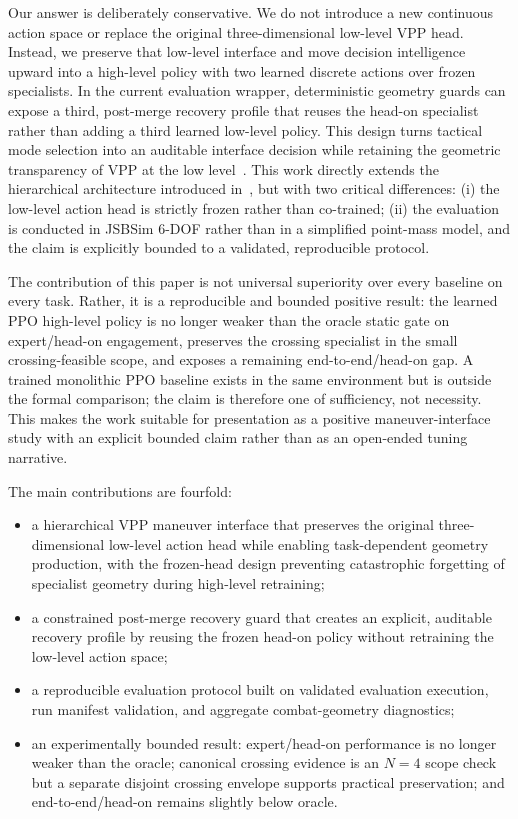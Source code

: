 \documentclass[5p,times]{elsarticle} %
\begin{document}
Our answer is deliberately conservative. We do not introduce a new continuous action space or replace the original three-dimensional low-level VPP head. Instead, we preserve that low-level interface and move decision intelligence upward into a high-level policy with two learned discrete actions over frozen specialists. In the current evaluation wrapper, deterministic geometry guards can expose a third, post-merge recovery profile that reuses the head-on specialist rather than adding a third learned low-level policy. This design turns tactical mode selection into an auditable interface decision while retaining the geometric transparency of VPP at the low level~\cite{glanois2024}. This work directly extends the hierarchical architecture introduced in~\cite{lai2026aerospace}, but with two critical differences: (i) the low-level action head is strictly frozen rather than co-trained; (ii) the evaluation is conducted in JSBSim 6-DOF rather than in a simplified point-mass model, and the claim is explicitly bounded to a validated, reproducible protocol.

The contribution of this paper is not universal superiority over every baseline on every task. Rather, it is a reproducible and bounded positive result: the learned PPO high-level policy is no longer weaker than the oracle static gate on expert/head-on engagement, preserves the crossing specialist in the small crossing-feasible scope, and exposes a remaining end-to-end/head-on gap. A trained monolithic PPO baseline exists in the same environment but is outside the formal comparison; the claim is therefore one of sufficiency, not necessity. This makes the work suitable for presentation as a positive maneuver-interface study with an explicit bounded claim rather than as an open-ended tuning narrative.

The main contributions are fourfold:
\begin{itemize}
    \item a hierarchical VPP maneuver interface that preserves the original three-dimensional low-level action head while enabling task-dependent geometry production, with the frozen-head design preventing catastrophic forgetting of specialist geometry during high-level retraining;
    \item a constrained post-merge recovery guard that creates an explicit, auditable recovery profile by reusing the frozen head-on policy without retraining the low-level action space;
    \item a reproducible evaluation protocol built on validated evaluation execution, run manifest validation, and aggregate combat-geometry diagnostics;
    \item an experimentally bounded result: expert/head-on performance is no longer weaker than the oracle; canonical crossing evidence is an $N=4$ scope check but a separate disjoint crossing envelope supports practical preservation; and end-to-end/head-on remains slightly below oracle.
\end{itemize}
\end{document}

